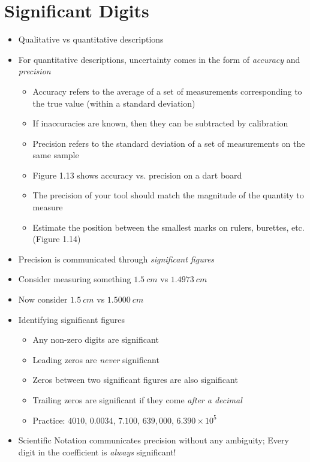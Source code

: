 \documentclass[12pt, openany, letterpaper]{memoir}
\begin{document}
\section{Significant Digits}
\begin{itemize}
	\item Qualitative vs quantitative descriptions
	\item For quantitative descriptions, uncertainty comes in the form of \emph{accuracy} and \emph{precision}
	      \begin{itemize}
		      \item Accuracy refers to the average of a set of measurements corresponding to the true value (within a standard deviation)
		      \item If inaccuracies are known, then they can be subtracted by calibration
		      \item Precision refers to the standard deviation of a set of measurements on the same sample
		      \item Figure 1.13 shows accuracy vs. precision on a dart board
		      \item The precision of your tool should match the magnitude of the quantity to measure
		      \item Estimate the position between the smallest marks on rulers, burettes, etc. (Figure 1.14)
	      \end{itemize}
	\item Precision is communicated through \emph{significant figures}
	\item Consider measuring something $1.5~cm$ vs $1.4973~cm$
	\item Now consider $1.5~cm$ vs $1.5000~cm$
	\item Identifying significant figures
	      \begin{itemize}
		      \item Any non-zero digits are significant
		      \item Leading zeros are \emph{never} significant
		      \item Zeros between two significant figures are also significant
		      \item Trailing zeros are significant if they come \emph{after a decimal}
		      \item Practice: $4010$, $0.0034$, $7.100$, $639,000$, $6.390\times10^{5}$
	      \end{itemize}
	\item Scientific Notation communicates precision without any ambiguity; Every digit in the coefficient is \emph{always} significant!

\end{itemize}
\end{document}
